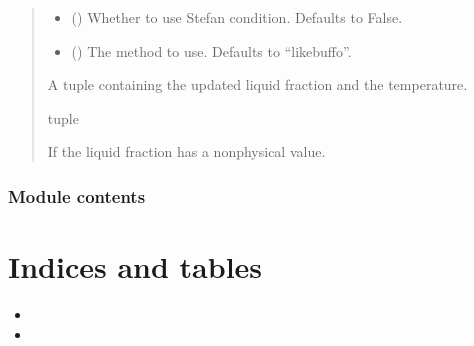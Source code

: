 \documentclass[a4paper,11pt,english,openany]{sphinxmanual}
\begin{document}
\begin{fulllineitems}
\begin{quote}
\begin{description}
\begin{itemize}
\item {} 
\sphinxAtStartPar
{} (\sphinxstyleliteralemphasis{\sphinxupquote{, }}) \textendash{} Whether to use Stefan condition. Defaults to False.

\item {} 
\sphinxAtStartPar
{} (\sphinxstyleliteralemphasis{\sphinxupquote{, }}) \textendash{} The method to use. Defaults to “likebuffo”.

\end{itemize}

\sphinxAtStartPar
A tuple containing the updated liquid fraction and the temperature.

\sphinxAtStartPar
tuple

\sphinxAtStartPar
{} \textendash{} If the liquid fraction has a non\sphinxhyphen{}physical value.

\end{description}\end{quote}

\end{fulllineitems}



\subsection{Module contents}
\label{\detokenize{api/spyice:module-spyice}}\label{\detokenize{api/spyice:module-contents}}

\chapter{Indices and tables}
\label{\detokenize{index:indices-and-tables}}\begin{itemize}
\item {} 
\sphinxAtStartPar
{}

\item {} 
\sphinxAtStartPar
{}

\end{itemize}
\end{document}
